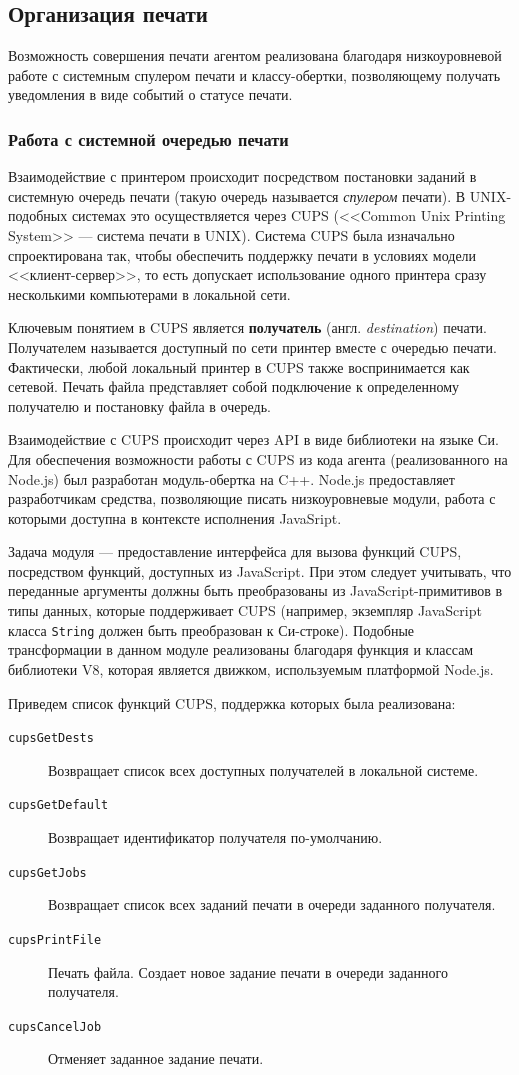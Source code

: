 \documentclass[a4paper,14pt,href]{article}
\begin{document}
\subsection{Организация печати}
Возможность совершения печати агентом реализована благодаря низкоуровневой работе с системным спулером печати и классу-обертки,
позволяющему получать уведомления в виде событий о статусе печати.

\subsubsection{Работа с системной очередью печати}
Взаимодействие с принтером происходит посредством постановки заданий в системную очередь печати (такую очередь называется
\textit{спулером} печати). В UNIX-подобных системах это осуществляется через CUPS (<<Common Unix Printing System>> ---
система печати в UNIX). Система CUPS была изначально спроектирована так, чтобы обеспечить поддержку печати в условиях
модели <<клиент-сервер>>, то есть допускает использование одного принтера сразу несколькими компьютерами в локальной сети.

Ключевым понятием в CUPS является \textbf{получатель} (англ. \textit{destina\-ti\-on}) печати. Получателем называется
доступный по сети принтер вместе с очередью печати. Фактически, любой локальный принтер в CUPS также воспринимается как
сетевой. Печать файла представляет собой подключение к определенному получателю и постановку файла в очередь.

Взаимодействие с CUPS происходит через API в виде библиотеки на языке Си\cite{CUPSAPI}. Для обеспечения возможности работы с CUPS
из кода агента (реализованного на Node.js) был разработан модуль-обертка на C++. Node.js предоставляет разработчикам
средства, позволяющие писать низкоуровневые модули, работа с которыми доступна в контексте исполнения JavaSript\cite{NodeJSAddons}.

Задача модуля --- предоставление интерфейса для вызова функций CUPS, посредством функций, доступных из JavaScript.
При этом следует учитывать, что переданные аргументы должны быть преобразованы из JavaScript-примитивов в типы данных,
которые поддерживает CUPS (например, экземпляр JavaScript класса \texttt{String} должен быть преобразован к Си-строке).
Подобные трансформации в данном модуле реализованы благодаря функция и классам библиотеки V8, которая является движком,
используемым платформой Node.js.

Приведем список функций CUPS, поддержка которых была реализована:
\begin{description}
  \item[\texttt{cupsGetDests}] Возвращает список всех доступных получателей в локальной системе.
  \item[\texttt{cupsGetDefault}] Возвращает идентификатор получателя по-умолчанию.
  \item[\texttt{cupsGetJobs}] Возвращает список всех заданий печати в очереди заданного получателя.
  \item[\texttt{cupsPrintFile}] Печать файла. Создает новое задание печати в очереди заданного получателя.
  \item[\texttt{cupsCancelJob}] Отменяет заданное задание печати.
\end{description}
\end{document}
